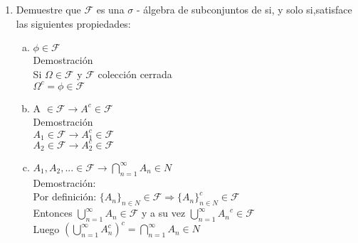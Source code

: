 \documentclass[12pt]{article}
\begin{document}
\maketitle
\begin{enumerate}
\item  Demuestre que $\mathcal{F}$ es una $\sigma$ - álgebra de subconjuntos de si, y solo si,satisface las siguientes propiedades:
\begin{enumerate}[a)]

\item $\phi \in \mathcal{F}$\\[0.2cm]
Demostración\\[0.2cm]
Si $\Omega \in \mathcal{F}$ y $ \mathcal{F}$ colección cerrada\\[0.2cm]
$\Omega^c = \phi\in\mathcal{F}$\\[0.2cm]

\item A $\in \mathcal{F}\longrightarrow A^{c} \in\mathcal{F}$\\[0.2cm]
Demostración\\[0.2cm]
$A_1\in \mathcal{F} \longrightarrow {A_1^c} \in \mathcal{F} $\\[0.2cm]
$A_2\in \mathcal{F} \longrightarrow {A_2^c} \in \mathcal{F} $\\[0.2cm]


\item $A_1,A_2,... \in \mathcal{F} \longrightarrow\displaystyle\bigcap_{n=1}^{\infty}{A_n \in N}$\\[0.2cm]
Demostración:\\[0.2cm]
Por definición: $\{A_n\}_{n \in N} \in \mathcal{F} \Rightarrow \{A_n\}^c_{n \in N}\in \mathcal{F}$\\[0.2cm]
Entonces $\displaystyle\bigcup_{n=1}^{\infty}{A_n}\in \mathcal{F}$ y a su vez $\displaystyle\bigcup_{n=1}^{\infty}{A_n}^c\in \mathcal{F}$\\[0.2cm]
Luego $\left(\displaystyle\bigcup_{n=1}^{\infty}{A_n^c}\right)^c = \displaystyle\bigcap_{n=1}^{\infty}{A_n \in N}$

\end{enumerate}


\end{enumerate}
\end{document}
